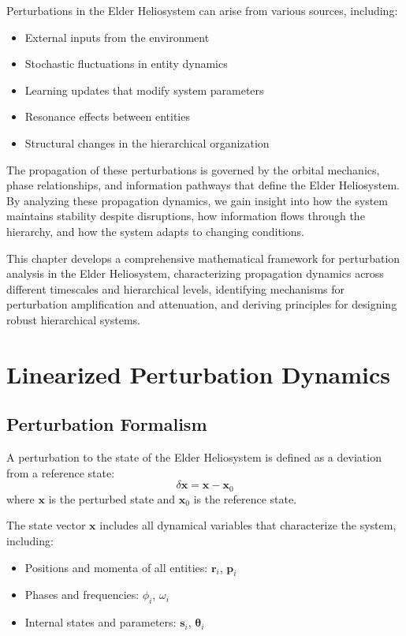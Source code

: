 Perturbations in the Elder Heliosystem can arise from various sources, including:
\begin{itemize}
    \item External inputs from the environment
    \item Stochastic fluctuations in entity dynamics
    \item Learning updates that modify system parameters
    \item Resonance effects between entities
    \item Structural changes in the hierarchical organization
\end{itemize}

The propagation of these perturbations is governed by the orbital mechanics, phase relationships, and information pathways that define the Elder Heliosystem. By analyzing these propagation dynamics, we gain insight into how the system maintains stability despite disruptions, how information flows through the hierarchy, and how the system adapts to changing conditions.

This chapter develops a comprehensive mathematical framework for perturbation analysis in the Elder Heliosystem, characterizing propagation dynamics across different timescales and hierarchical levels, identifying mechanisms for perturbation amplification and attenuation, and deriving principles for designing robust hierarchical systems.

\section{Linearized Perturbation Dynamics}

\subsection{Perturbation Formalism}

\begin{definition}
A perturbation to the state of the Elder Heliosystem is defined as a deviation from a reference state:
\begin{equation}
\delta\mathbf{x} = \mathbf{x} - \mathbf{x}_0
\end{equation}
where $\mathbf{x}$ is the perturbed state and $\mathbf{x}_0$ is the reference state.
\end{definition}

The state vector $\mathbf{x}$ includes all dynamical variables that characterize the system, including:
\begin{itemize}
    \item Positions and momenta of all entities: $\mathbf{r}_i$, $\mathbf{p}_i$
    \item Phases and frequencies: $\phi_i$, $\omega_i$
    \item Internal states and parameters: $\mathbf{s}_i$, $\boldsymbol{\theta}_i$
\end{itemize}

